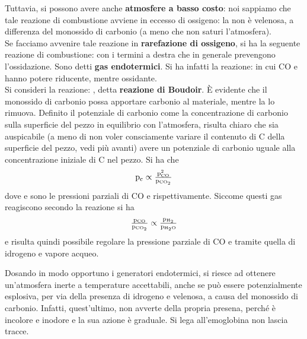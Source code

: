 Tuttavia, si possono avere anche \textbf{atmosfere a basso costo}: noi sappiamo che tale reazione di combustione  avviene in eccesso di ossigeno: la  non è velenosa, a differenza del monossido di carbonio (a meno che non saturi l’atmosfera).\\
Se facciamo avvenire tale reazione in \textbf{rarefazione di ossigeno}, si ha la seguente reazione di combustione:
con i termini a destra che in generale prevengono l'ossidazione. Sono detti \textbf{gas endotermici}. Si ha infatti la reazione:
 in cui CO e  hanno potere riducente, mentre  ossidante. \\
Si consideri la reazione: , detta \textbf{reazione di Boudoir}. È evidente che il monossido di carbonio possa apportare carbonio al materiale, mentre la  lo rimuova. Definito il potenziale di carbonio come la concentrazione di carbonio sulla superficie del pezzo in equilibrio con l'atmosfera, risulta chiaro che sia auspicabile (a meno di non voler consciamente variare il contenuto di C della superficie del pezzo, vedi più avanti) avere un potenziale di carbonio uguale alla concentrazione iniziale di C nel pezzo. Si ha che
\begin{equation*}
    \mbox{$\mathrm{p_c}$}\propto \mbox{$\mathrm{\frac{p^2_{CO}}{p_{CO_2}}}$}\label{eq:PotC}
\end{equation*}
dove  e  sono le pressioni parziali di CO e  rispettivamente. Siccome questi gas reagiscono secondo la reazione  si ha
\begin{equation*}
    \mbox{$\mathrm{\frac{p_{CO}}{p_{CO_2}}\propto \frac{p_{H_2}}{p_{H_2O}}}$}
\end{equation*}
e risulta quindi possibile regolare la pressione parziale di CO e tramite quella di idrogeno e vapore acqueo.

Dosando in modo opportuno i generatori endotermici, si riesce ad ottenere un’atmosfera inerte a temperature accettabili, anche se può essere potenzialmente esplosiva, per via della presenza di idrogeno e velenosa, a causa del monossido di carbonio. Infatti, quest’ultimo, non avverte della propria presena, perché è incolore e inodore e la sua azione è graduale. Si lega all’emoglobina non lascia tracce.

